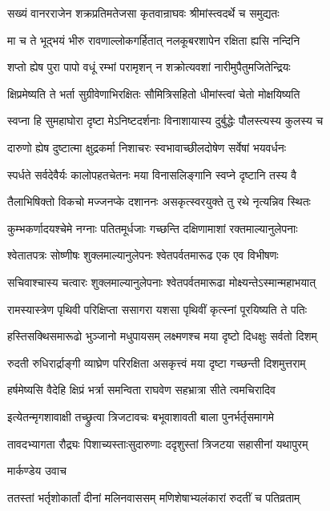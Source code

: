 \twolineshloka
{सख्यं वानरराजेन शक्रप्रतिमतेजसा}
{कृतवान्राघवः श्रीमांस्त्वदर्थे च समुद्यतः}


\twolineshloka
{मा च ते भूद्भयं भीरु रावणाल्लोकगर्हितात्}
{नलकूबरशापेन रक्षिता ह्यसि नन्दिनि}


\twolineshloka
{शप्तो ह्येष पुरा पापो वधूं रम्भां परामृशन्}
{न शक्रोत्यवशां नारीमुपैतुमजितेन्द्रियः}


\twolineshloka
{क्षिप्रमेष्यति ते भर्ता सुग्रीवेणाभिरक्षितः}
{सौमित्रिसहितो धीमांस्त्वां चेतो मोक्षयिष्यति}


\twolineshloka
{स्वप्ना हि सुमहाघोरा दृष्टा मेऽनिष्टदर्शनाः}
{विनाशायास्य दुर्बुद्धेः पौलस्त्यस्य कुलस्य च}


\twolineshloka
{दारुणो ह्येष दुष्टात्मा क्षुद्रकर्मा निशाचरः}
{स्वभावाच्छीलदोषेण सर्वेषां भयवर्धनः}


\twolineshloka
{स्पर्धते सर्वदेवैर्यः कालोपहतचेतनः}
{मया विनासलिङ्गानि स्वप्ने दृष्टानि तस्य वै}


\twolineshloka
{तैलाभिषिक्तो विकचो मज्जनप्के दशाननः}
{असकृत्स्वरयुक्ते तु रथे नृत्यन्निव स्थितः}


\twolineshloka
{कुम्भकर्णादयश्चेमे नग्नाः पतितमूर्धजाः}
{गच्छन्ति दक्षिणामाशां रक्तमाल्यानुलेपनाः}


\twolineshloka
{श्वेतातपत्रः सोष्णीषः शुक्लमाल्यानुलेपनः}
{श्वेतपर्वतमारूढ एक एव विभीषणः}


\twolineshloka
{सचिवाश्चास्य चत्वारः शुक्लमाल्यानुलेपनाः}
{श्वेतपर्वतमारूढा मोक्ष्यन्तेऽस्मान्महाभयात्}


\twolineshloka
{रामस्यास्त्रेण पृथिवी परिक्षिप्ता ससागरा}
{यशसा पृथिवीं कृत्स्नां पूरयिष्यति ते पतिः}


\twolineshloka
{हस्तिसक्थिसमारूढो भुञ्जानो मधुपायसम्}
{लक्ष्मणश्च मया दृष्टो दिधक्षुः सर्वतो दिशम्}


\twolineshloka
{रुदती रुधिरार्द्राङ्गी व्याघ्रेण परिरक्षिता}
{असकृत्त्वं मया दृष्टा गच्छन्ती दिशमुत्तराम्}


\twolineshloka
{हर्षमेष्यसि वैदेहि क्षिप्रं भर्त्रा समन्विता}
{राघवेण सहभ्रात्रा सीते त्वमचिरादिव}


\twolineshloka
{इत्येतन्मृगशावाक्षी तच्छ्रुत्वा त्रिजटावचः}
{बभूवाशावती बाला पुनर्भर्तृसमागमे}


\twolineshloka
{तावदभ्यागता रौद्र्यः पिशाच्यस्ताःसुदारुणाः}
{ददृशुस्तां त्रिजटया सहासीनां यथापुरम्}


\twolineshloka
{मार्कण्डेय उवाच}
{}


\twolineshloka
{ततस्तां भर्तृशोकार्तां दीनां मलिनवाससम्}
{मणिशेषाभ्यलंकारां रुदतीं च पतिव्रताम्}


